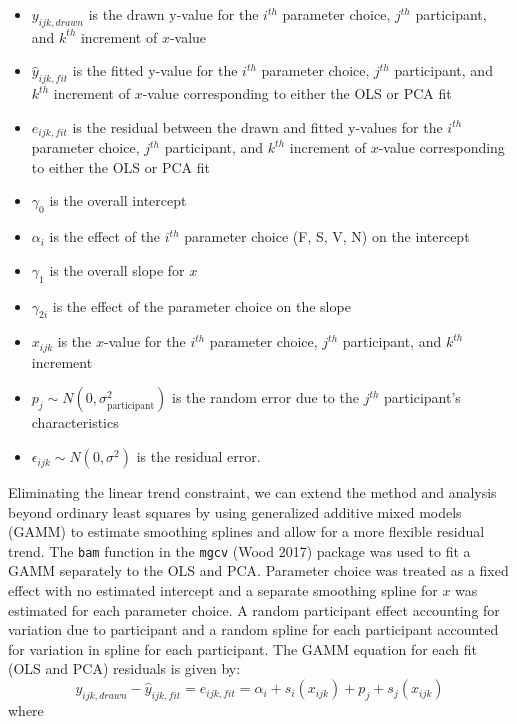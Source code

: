 \documentclass[
]{jds}
\providecommand{\tightlist}{%
  \setlength{\itemsep}{0pt}\setlength{\parskip}{0pt}}\usepackage{longtable,booktabs,array}
\begin{document}
\begin{itemize}
\tightlist
\item
  \(y_{ijk,drawn}\) is the drawn y-value for the \(i^{th}\) parameter
  choice, \(j^{th}\) participant, and \(k^{th}\) increment of
  \(x\)-value
\item
  \(\hat y_{ijk,fit}\) is the fitted y-value for the \(i^{th}\)
  parameter choice, \(j^{th}\) participant, and \(k^{th}\) increment of
  \(x\)-value corresponding to either the OLS or PCA fit
\item
  \(e_{ijk,fit}\) is the residual between the drawn and fitted y-values
  for the \(i^{th}\) parameter choice, \(j^{th}\) participant, and
  \(k^{th}\) increment of \(x\)-value corresponding to either the OLS or
  PCA fit
\item
  \(\gamma_0\) is the overall intercept
\item
  \(\alpha_i\) is the effect of the \(i^{th}\) parameter choice (F, S,
  V, N) on the intercept
\item
  \(\gamma_1\) is the overall slope for \(x\)
\item
  \(\gamma_{2i}\) is the effect of the parameter choice on the slope
\item
  \(x_{ijk}\) is the \(x\)-value for the \(i^{th}\) parameter choice,
  \(j^{th}\) participant, and \(k^{th}\) increment
\item
  \(p_{j} \sim N(0, \sigma^2_\text{participant})\) is the random error
  due to the \(j^{th}\) participant's characteristics
\item
  \(\epsilon_{ijk} \sim N(0, \sigma^2)\) is the residual error.
\end{itemize}

Eliminating the linear trend constraint, we can extend the method and
analysis beyond ordinary least squares by using generalized additive
mixed models (GAMM) to estimate smoothing splines and allow for a more
flexible residual trend. The \texttt{bam} function in the \texttt{mgcv}
(Wood 2017) package was used to fit a GAMM separately to the OLS and
PCA. Parameter choice was treated as a fixed effect with no estimated
intercept and a separate smoothing spline for \(x\) was estimated for
each parameter choice. A random participant effect accounting for
variation due to participant and a random spline for each participant
accounted for variation in spline for each participant. The GAMM
equation for each fit (OLS and PCA) residuals is given by:
\begin{equation}
y_{ijk, drawn} - \hat y_{ijk, fit} = e_{ijk,fit} = \alpha_i + s_{i}(x_{ijk}) + p_{j} + s_{j}(x_{ijk})
\end{equation} \noindent where
\end{document}
